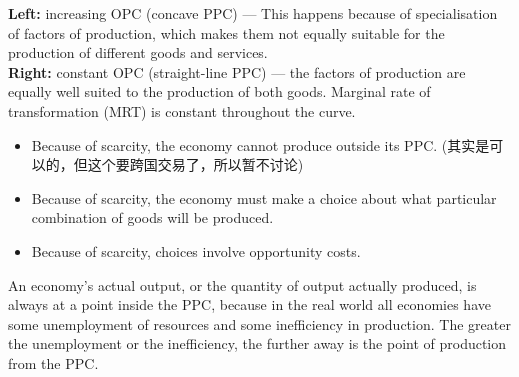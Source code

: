\begin{center}
\end{center}
\textbf{Left:} increasing OPC (concave PPC) --- This happens because of specialisation of factors of production, which makes them not equally suitable for the production of different goods and services.\\
\textbf{Right:} constant OPC (straight-line PPC) --- the factors of production are equally well suited to the production of both goods. Marginal rate of transformation (MRT) is constant throughout the curve.
\begin{itemize}
  \item Because of scarcity, the economy cannot produce outside its PPC. (其实是可以的，但这个要跨国交易了，所以暂不讨论)
  \item Because of scarcity, the economy must make a choice about what particular combination of goods will be produced.
  \item Because of scarcity, choices involve opportunity costs.
\end{itemize}
An economy's actual output, or the quantity
of output actually produced, is always at a point inside the PPC, because in the real world all economies have some unemployment of resources and some inefficiency in production. The greater the unemployment or the inefficiency, the further away is the point of production from the PPC.\\\\
